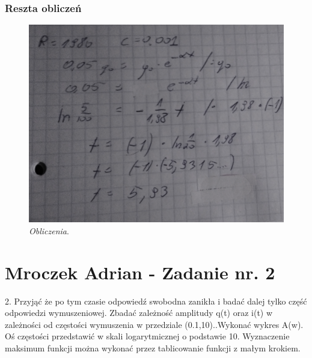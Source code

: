 \documentclass[12pt,oneside,a4paper]{book} %
\begin{document}
\subsection{Reszta obliczeń}
\begin{figure}[h]
\begin{center} 

\includegraphics[scale=0.5]{./images/01.PNG} 

\caption{\textit{Obliczenia}.\newline }
\label{rys:logoup}
\end{center}
\end{figure}



\chapter{Mroczek Adrian - Zadanie nr. 2 }

2. Przyjąć że po tym czasie odpowiedź swobodna zanikła i badać dalej tylko część
odpowiedzi wymuszeniowej. Zbadać zależność amplitudy q(t) oraz i(t) w zależności
od częstości wymuszenia w przedziale (0.1,10)..Wykonać wykres A(w). Oś częstości przedstawić w skali logarytmicznej
o podstawie 10. Wyznaczenie maksimum funkcji można wykonać przez tablicowanie funkcji z małym krokiem.
\end{document}
